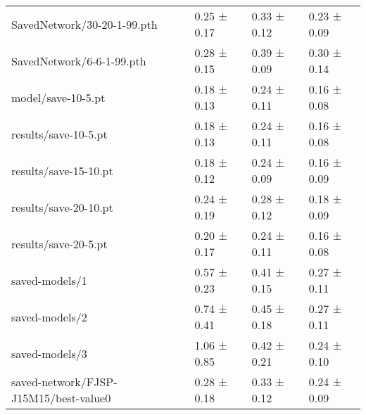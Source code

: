 \begin{tabular}{llll}
    SavedNetwork/30-20-1-99.pth & 0.25 ± 0.17 & 0.33 ± 0.12 & 0.23 ± 0.09 \\
    SavedNetwork/6-6-1-99.pth & 0.28 ± 0.15 & 0.39 ± 0.09 & 0.30 ± 0.14 \\
    model/save-10-5.pt & 0.18 ± 0.13 & 0.24 ± 0.11 & 0.16 ± 0.08 \\
    results/save-10-5.pt & 0.18 ± 0.13 & 0.24 ± 0.11 & 0.16 ± 0.08 \\
    results/save-15-10.pt & 0.18 ± 0.12 & 0.24 ± 0.09 & 0.16 ± 0.09 \\
    results/save-20-10.pt & 0.24 ± 0.19 & 0.28 ± 0.12 & 0.18 ± 0.09 \\
    results/save-20-5.pt & 0.20 ± 0.17 & 0.24 ± 0.11 & 0.16 ± 0.08 \\
    saved-models/1 & 0.57 ± 0.23 & 0.41 ± 0.15 & 0.27 ± 0.11 \\
    saved-models/2& 0.74 ± 0.41 & 0.45 ± 0.18 & 0.27 ± 0.11 \\
    saved-models/3 & 1.06 ± 0.85 & 0.42 ± 0.21 & 0.24 ± 0.10 \\
    saved-network/FJSP-J15M15/best-value0 & 0.28 ± 0.18 & 0.33 ± 0.12 & 0.24 ± 0.09 \\
    \bottomrule
    \end{tabular}
    
    